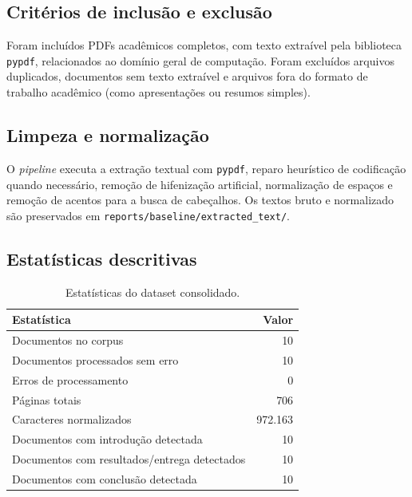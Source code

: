 \documentclass[12pt]{article}
\begin{document}
\subsection{Critérios de inclusão e exclusão}

Foram incluídos PDFs acadêmicos completos, com texto extraível pela biblioteca \texttt{pypdf}, relacionados ao domínio geral de computação. Foram excluídos arquivos duplicados, documentos sem texto extraível e arquivos fora do formato de trabalho acadêmico (como apresentações ou resumos simples).

\subsection{Limpeza e normalização}

O \textit{pipeline} executa a extração textual com \texttt{pypdf}, reparo heurístico de codificação quando necessário, remoção de hifenização artificial, normalização de espaços e remoção de acentos para a busca de cabeçalhos. Os textos bruto e normalizado são preservados em \texttt{reports/baseline/extracted\_text/}.

\subsection{Estatísticas descritivas}

\begin{table}[h]
    \centering
    \begin{tabular}{lr}
        \toprule
        Estatística & Valor \\
        \midrule
        Documentos no corpus & 10 \\
        Documentos processados sem erro & 10 \\
        Erros de processamento & 0 \\
        Páginas totais & 706 \\
        Caracteres normalizados & 972.163 \\
        Documentos com introdução detectada & 10 \\
        Documentos com resultados/entrega detectados & 10 \\
        Documentos com conclusão detectada & 10 \\
        \bottomrule
    \end{tabular}
    \caption{Estatísticas do dataset consolidado.}
\end{table}
\end{document}

